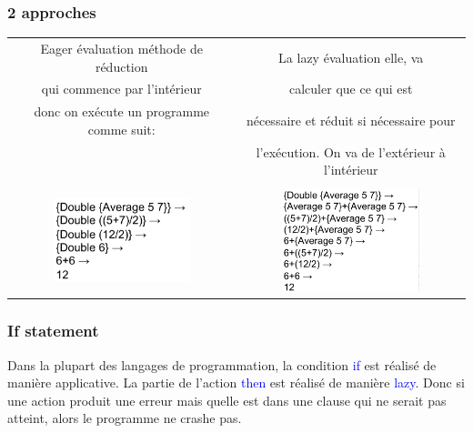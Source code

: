 \documentclass{report}
\begin{document}
\subsubsection{2 approches}
\begin{tabular}{|c|c|}
Eager évaluation méthode de réduction & La lazy évaluation elle, va\\
qui commence par l'intérieur & calculer que ce qui est \\
 donc on exécute un programme comme suit: &  nécessaire et réduit si nécessaire pour \\
 & l'exécution. On va de l'extérieur à l'intérieur\\
  & \\
\includegraphics[width=4cm]{img/Eager.png} & \includegraphics[width=4cm]{img/Lazy.png}
\end{tabular}

\subsubsection{If statement}
Dans la plupart des langages de programmation, la condition \textcolor{blue}{if} est réalisé de manière applicative. La partie de l'action \textcolor{blue}{then} est réalisé de manière \textcolor{blue}{lazy}. Donc si une action produit une erreur mais quelle est dans une clause qui ne serait pas atteint, alors le programme ne crashe pas.
\end{document}
